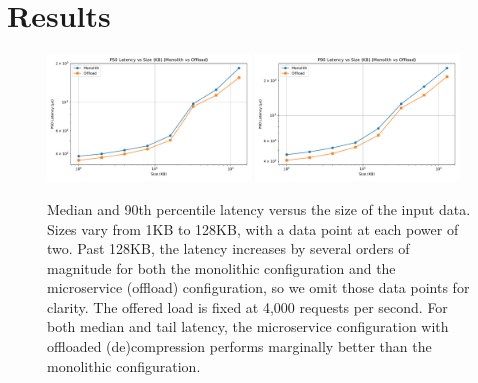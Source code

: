 \section{Results}
\begin{figure}[!ht]            %
  \centering
  \includegraphics[width=0.48\textwidth]{size.pdf}%
  \hfill
  \includegraphics[width=0.48\textwidth]{size_p90.pdf}
  \caption{Median and 90th percentile latency versus the size of the input data. Sizes vary from 1KB to 128KB, with a data point at each power of two. Past 128KB, the latency increases by several orders of magnitude for both the monolithic configuration and the microservice (offload) configuration, so we omit those data points for clarity. The offered load is fixed at 4,000 requests per second. For both median and tail latency, the microservice configuration with offloaded (de)compression performs marginally better than the monolithic configuration.}
  \label{fig:size}
\end{figure}

